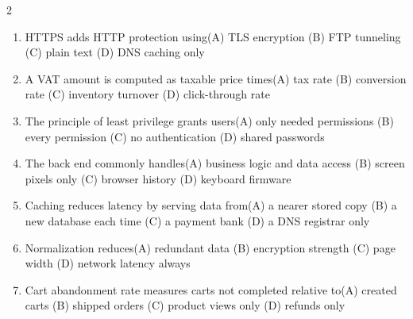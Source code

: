 \documentclass[a4paper]{article}
\begin{document}
\begin{multicols*}{2}
\fontsize{8.5}{10}\selectfont
\begin{enumerate}[resume]
\item HTTPS adds HTTP protection using\newline\hspace*{0.6em}(A) TLS encryption \quad (B) FTP tunneling \newline\hspace*{0.6em}(C) plain text \quad (D) DNS caching only
\item A VAT amount is computed as taxable price times\newline\hspace*{0.6em}(A) tax rate \quad (B) conversion rate \newline\hspace*{0.6em}(C) inventory turnover \quad (D) click-through rate
\item The principle of least privilege grants users\newline\hspace*{0.6em}(A) only needed permissions \quad (B) every permission \newline\hspace*{0.6em}(C) no authentication \quad (D) shared passwords
\item The back end commonly handles\newline\hspace*{0.6em}(A) business logic and data access \quad (B) screen pixels only \newline\hspace*{0.6em}(C) browser history \quad (D) keyboard firmware
\item Caching reduces latency by serving data from\newline\hspace*{0.6em}(A) a nearer stored copy \quad (B) a new database each time \newline\hspace*{0.6em}(C) a payment bank \quad (D) a DNS registrar only
\item Normalization reduces\newline\hspace*{0.6em}(A) redundant data \quad (B) encryption strength \newline\hspace*{0.6em}(C) page width \quad (D) network latency always
\item Cart abandonment rate measures carts not completed relative to\newline\hspace*{0.6em}(A) created carts \quad (B) shipped orders \newline\hspace*{0.6em}(C) product views only \quad (D) refunds only

\end{enumerate}
\end{multicols*}
\end{document}
